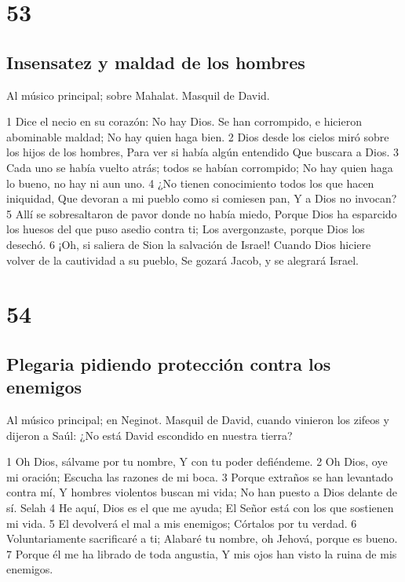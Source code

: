 \chapter{53}

\section*{Insensatez y maldad de los hombres}

Al músico principal; sobre Mahalat. Masquil de David.

1 Dice el necio en su corazón: No hay Dios.
Se han corrompido, e hicieron abominable maldad;
No hay quien haga bien.
2 Dios desde los cielos miró sobre los hijos de los hombres,
Para ver si había algún entendido
Que buscara a Dios.
3 Cada uno se había vuelto atrás; todos se habían corrompido;
No hay quien haga lo bueno, no hay ni aun uno.
4 ¿No tienen conocimiento todos los que hacen iniquidad,
Que devoran a mi pueblo como si comiesen pan,
Y a Dios no invocan?
5 Allí se sobresaltaron de pavor donde no había miedo,
Porque Dios ha esparcido los huesos del que puso asedio contra ti;
Los avergonzaste, porque Dios los desechó.
6 ¡Oh, si saliera de Sion la salvación de Israel!
Cuando Dios hiciere volver de la cautividad a su pueblo,
Se gozará Jacob, y se alegrará Israel.

\chapter{54}

\section*{Plegaria pidiendo protección contra los enemigos}

Al músico principal; en Neginot. Masquil de David, cuando vinieron los zifeos y dijeron a Saúl: ¿No está David escondido en nuestra tierra?

1 Oh Dios, sálvame por tu nombre,
Y con tu poder defiéndeme.
2 Oh Dios, oye mi oración;
Escucha las razones de mi boca.
3 Porque extraños se han levantado contra mí,
Y hombres violentos buscan mi vida;
No han puesto a Dios delante de sí. Selah
4 He aquí, Dios es el que me ayuda;
El Señor está con los que sostienen mi vida.
5 El devolverá el mal a mis enemigos;
Córtalos por tu verdad.
6 Voluntariamente sacrificaré a ti;
Alabaré tu nombre, oh Jehová, porque es bueno.
7 Porque él me ha librado de toda angustia,
Y mis ojos han visto la ruina de mis enemigos.

